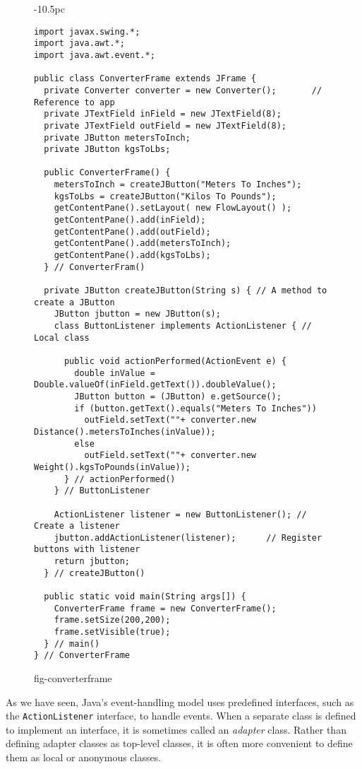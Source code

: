 \begin{figure}[h!]
\jjjprogstart
\begin{jjjlistingleft}[36.5pc]{-10.5pc}
\begin{lstlisting}
import javax.swing.*;
import java.awt.*;
import java.awt.event.*;

public class ConverterFrame extends JFrame {
  private Converter converter = new Converter();       // Reference to app
  private JTextField inField = new JTextField(8);
  private JTextField outField = new JTextField(8);
  private JButton metersToInch;
  private JButton kgsToLbs;

  public ConverterFrame() {
    metersToInch = createJButton("Meters To Inches");
    kgsToLbs = createJButton("Kilos To Pounds");
    getContentPane().setLayout( new FlowLayout() );
    getContentPane().add(inField);
    getContentPane().add(outField);
    getContentPane().add(metersToInch);
    getContentPane().add(kgsToLbs);
  } // ConverterFram()

  private JButton createJButton(String s) { // A method to create a JButton
    JButton jbutton = new JButton(s);
    class ButtonListener implements ActionListener { // Local class

      public void actionPerformed(ActionEvent e) {
        double inValue = Double.valueOf(inField.getText()).doubleValue();
        JButton button = (JButton) e.getSource();
        if (button.getText().equals("Meters To Inches"))
          outField.setText(""+ converter.new Distance().metersToInches(inValue));
        else
          outField.setText(""+ converter.new Weight().kgsToPounds(inValue));
      } // actionPerformed()
    } // ButtonListener

    ActionListener listener = new ButtonListener(); // Create a listener
    jbutton.addActionListener(listener);      // Register buttons with listener
    return jbutton;
  } // createJButton()

  public static void main(String args[]) {
    ConverterFrame frame = new ConverterFrame();
    frame.setSize(200,200);
    frame.setVisible(true);
  } // main()
} // ConverterFrame
\end{lstlisting}
\end{jjjlistingleft}
 {fig-converterframe}
\end{figure}
\noindent As we have seen, Java's event-handling model uses predefined
interfaces, such as the {\tt ActionListener} interface, to handle
events.  When a separate class is defined to implement an interface, it
is sometimes called an {\it adapter} class.  Rather than defining
adapter classes as top-level classes, it is often more convenient to
define them as local or anonymous classes.   


